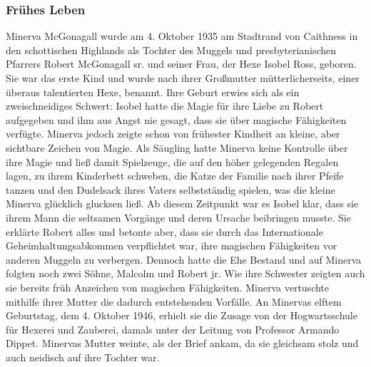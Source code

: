 \documentclass[a4paper, 10pt]{article}
\begin{document}
\subsubsection*{\large Frühes Leben}
Minerva McGonagall wurde am 4. Oktober 1935 am Stadtrand von Caithness in den schottischen Highlands als Tochter des Muggels und presbyterianischen Pfarrers Robert McGonagall sr. und seiner Frau, der Hexe Isobel Ross, geboren. Sie war das erste Kind und wurde nach ihrer Großmutter mütterlicherseits, einer überaus talentierten Hexe, benannt.
\vspace{10pt}
\newline
Ihre Geburt erwies sich als ein zweischneidiges Schwert: Isobel hatte die Magie für ihre Liebe zu Robert aufgegeben und ihm aus Angst nie gesagt, dass sie über magische Fähigkeiten verfügte. Minerva jedoch zeigte schon von frühester Kindheit an kleine, aber sichtbare Zeichen von Magie. Als Säugling hatte Minerva keine Kontrolle über ihre Magie und ließ damit Spielzeuge, die auf den höher gelegenden Regalen lagen, zu ihrem Kinderbett schweben, die Katze der Familie nach ihrer Pfeife tanzen und den Dudelsack ihres Vaters selbstständig spielen, was die kleine Minerva glücklich glucksen ließ. Ab diesem Zeitpunkt war es Isobel klar, dass sie ihrem Mann die seltsamen Vorgänge und deren Ursache beibringen musste. Sie erklärte Robert alles und betonte aber, dass sie durch das Internationale Geheimhaltungsabkommen verpflichtet war, ihre magischen Fähigkeiten vor anderen Muggeln zu verbergen.
\vspace{10pt}
\newline
Dennoch hatte die Ehe Bestand und auf Minerva folgten noch zwei Söhne, Malcolm und Robert jr. Wie ihre Schwester zeigten auch sie bereits früh Anzeichen von magischen Fähigkeiten. Minerva vertuschte mithilfe ihrer Mutter die dadurch entstehenden Vorfälle.
\vspace{10pt}
\newline
An Minervas elftem Geburtstag, dem 4. Oktober 1946, erhielt sie die Zusage von der Hogwartsschule für Hexerei und Zauberei, damals unter der Leitung von Professor Armando Dippet. Minervas Mutter weinte, als der Brief ankam, da sie gleichsam stolz und auch neidisch auf ihre Tochter war.
\end{document}
